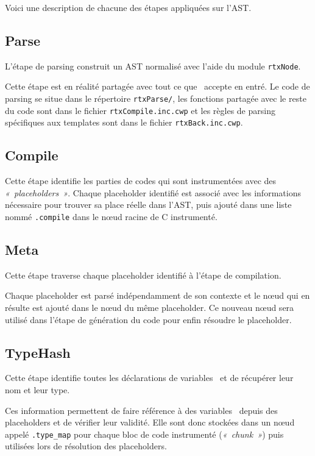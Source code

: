 \documentclass[french]{rtxreport}
\begin{document}
Voici une description de chacune des étapes appliquées sur l'AST.

\subsection{Parse}

L'étape de parsing construit un AST normalisé avec l'aide du module
\texttt{rtxNode}.

Cette étape est en réalité partagée avec tout ce que \rtx\ accepte en entré. Le
code de parsing se situe dans le répertoire \texttt{rtxParse/}, les fonctions
partagée avec le reste du code sont dans le fichier \texttt{rtxCompile.inc.cwp}
et les règles de parsing spécifiques aux templates sont dans le fichier
\texttt{rtxBack.inc.cwp}.

\subsection{Compile}

Cette étape identifie les parties de codes qui sont instrumentées avec des
\emph{«~placeholders~»}. Chaque placeholder identifié est associé avec les
informations nécessaire pour trouver sa place réelle dans l'AST, puis ajouté
dans une liste nommé \texttt{.compile} dans le nœud racine de C instrumenté.

\subsection{Meta}

Cette étape traverse chaque placeholder identifié à l'étape de compilation.

Chaque placeholder est parsé indépendamment de son contexte et le nœud qui en
résulte est ajouté dans le nœud du même placeholder. Ce nouveau nœud sera
utilisé dans l'étape de génération du code pour enfin résoudre le placeholder.

\subsection{TypeHash}

Cette étape identifie toutes les déclarations de variables \rtx\ et de récupérer
leur nom et leur type.

Ces information permettent de faire référence à des variables \rtx\ depuis des
placeholders et de vérifier leur validité. Elle sont donc stockées dans un nœud
appelé \texttt{.type\_map} pour chaque bloc de code instrumenté
(\emph{«~chunk~»}) puis utilisées lors de résolution des placeholders.
\end{document}
